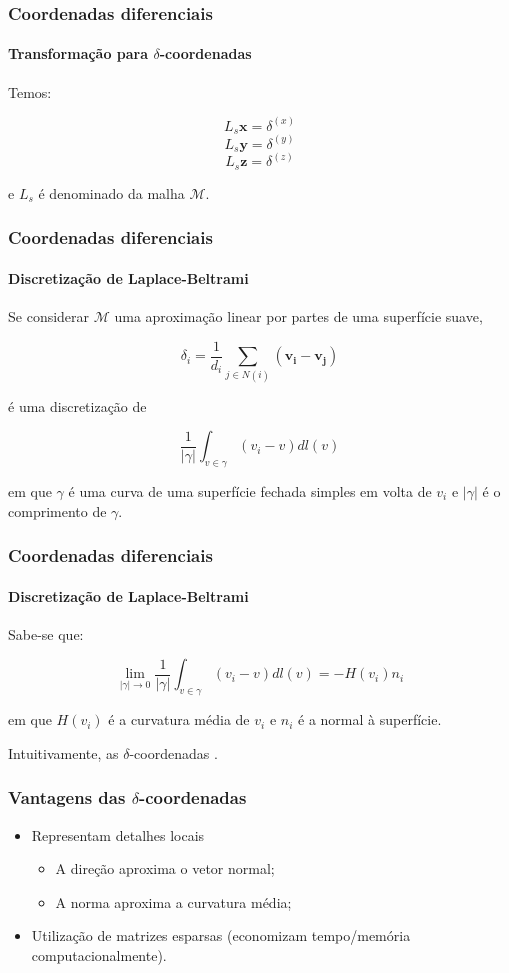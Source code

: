 \begin{frame}
\frametitle{Coordenadas diferenciais}
\framesubtitle{Transformação para $\delta$-coordenadas}

Temos:

$$L_s \textbf{x} = \delta^{(x)}$$
$$L_s \textbf{y} = \delta^{(y)}$$
$$L_s \textbf{z} = \delta^{(z)}$$

e $L_s$ é denominado  da malha $\mathcal M$.

\end{frame}

\begin{frame}
\frametitle{Coordenadas diferenciais}
\framesubtitle{Discretização de Laplace-Beltrami}

Se considerar $\mathcal{M}$ uma aproximação linear por partes de uma superfície suave,

$$\delta_i = \frac{1}{d_i} \sum_{j \in N(i)}(\mathbf{v_i} - \mathbf{v_j})$$

é uma discretização de

$$\frac{1}{|\gamma|} \int_{v \in \gamma} (v_i - v) dl(v)$$

em que $\gamma$ é uma curva de uma superfície fechada simples em volta de $v_i$ e $|\gamma|$ é o comprimento de $\gamma$.

\end{frame}

\begin{frame}
\frametitle{Coordenadas diferenciais}
\framesubtitle{Discretização de Laplace-Beltrami}

Sabe-se que:

$$\lim\limits_{|\gamma|\rightarrow 0} \frac{1}{|\gamma|} \int_{v \in \gamma} (v_i - v) dl(v) = - H(v_i) n_i$$

em que $H(v_i)$ é a curvatura média de $v_i$ e $n_i$ é a normal à superfície.

\medskip

Intuitivamente, as $\delta$-coordenadas .

\end{frame}

\begin{frame}
\frametitle{Vantagens das $\delta$-coordenadas}
	\begin{itemize}
		\item Representam detalhes locais
		\begin{itemize}
			\item A direção aproxima o vetor normal;
			\item A norma aproxima a curvatura média;
		\end{itemize}
		\medskip
		\item Utilização de matrizes esparsas (economizam tempo/memória computacionalmente).
	\end{itemize}
\end{frame}

